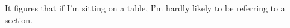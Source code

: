 \documentclass{article}
\begin{document}
It figures that if I'm sitting on a table, I'm hardly likely to be referring to a section. 
\end{document}
